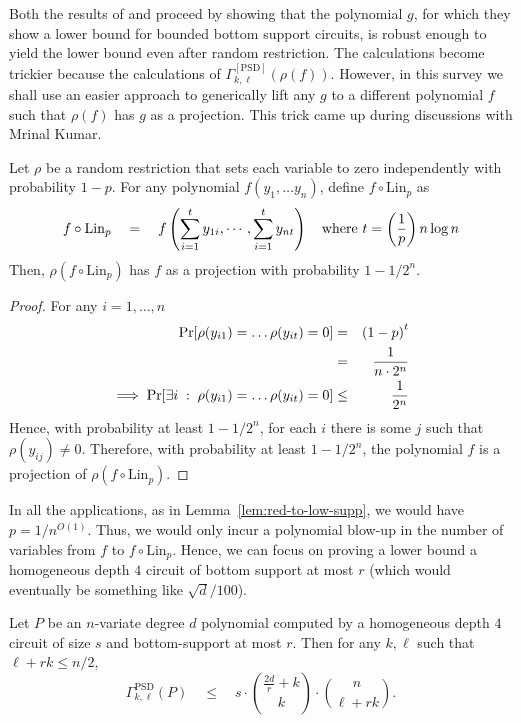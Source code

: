\documentclass{beatcs}
\newcommand{\spaced}[1]{\quad#1\quad}
\begin{document}
Both the results of \cite{KLSS} and \cite{KS14} proceed by showing that the polynomial $g$, for which they show a lower bound for bounded bottom support circuits, is robust enough to yield the lower bound even after random restriction. The calculations become trickier because the calculations of $\Gamma^{[\mathrm{PSD}]}_{k,\ell}(\rho(f))$. However, in this survey we shall use an easier approach to generically lift any $g$ to a different polynomial $f$ such that $\rho(f)$ has $g$ as a projection. This trick came up during discussions with Mrinal Kumar. 

\begin{lemma}\label{lem:lin-transform-trick}
Let $\rho$ be a random restriction that sets each variable to zero independently with probability $1 - p$. For any polynomial $f(y_1,\dots y_n)$, define $f \circ \mathrm{Lin}_p$ as
\[
f \circ \mathrm{Lin}_p \spaced{=} f\inparen{\sum_{i=1}^t y_{1i}, \cdots, \sum_{i=1}^t y_{nt}}\quad \text{where $t = \inparen{\frac{1}{p}} n \log n$}
\]
Then, $\rho(f \circ \mathrm{Lin}_p)$ has $f$ as a projection with probability $1 - 1/2^{n}$. 
\end{lemma}
\begin{proof} For any $i = 1, \dots, n$
\begin{eqnarray*}
\quad \Pr[\rho(y_{i1}) = \dots \rho(y_{it}) = 0 ] & = & \left(1 - p\right)^t\\ 
& = & \frac{1}{n\cdot 2^n}\\
\implies \Pr[\exists i\;:\;\rho(y_{i1}) = \dots \rho(y_{it}) = 0 ]  & \leq  & \frac{1}{2^n} 
\end{eqnarray*}
Hence, with probability at least $1 - 1/2^n$, for each $i$ there is some $j$ such that $\rho(y_{ij}) \neq 0$. Therefore, with probability at least $1 - 1/2^n$, the polynomial $f$ is a projection of $\rho(f \circ \mathrm{Lin}_p)$. \end{proof}

In all the applications, as in Lemma~\ref{lem:red-to-low-supp}, we would have $p = 1/n^{O(1)}$. Thus, we would only incur a polynomial blow-up in the number of variables from $f$ to $f\circ \mathrm{Lin}_p$. Hence, we can focus on proving a lower bound  a homogeneous depth $4$ circuit of bottom support at most $r$ (which would eventually be something like $\sqrt{d}/100$). 

\begin{lemma}\label{lem:upper-bound-low-supp}
Let $P$ be an $n$-variate degree $d$ polynomial computed by a homogeneous depth $4$ circuit of size $s$ and bottom-support at most $r$. Then for any $k,\ell$ such that $\ell + rk \leq n/2$, 
\[
\Gamma^{\mathrm{PSD}}_{k,\ell}(P) \quad \leq \quad s \cdot \binom{\frac{2d}{r}+k}{k}\cdot \binom{n}{\ell+rk}. 
\]
\end{lemma}
\end{document}
